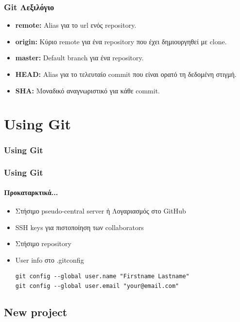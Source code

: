 \documentclass[handout]{beamer}
\begin{document}
\begin{frame}
  \frametitle{Git Λεξιλόγιο}
  \begin{itemize}
  \item \textbf{remote:} Alias για το url ενός repository.
  \item \textbf{origin:} Κύριο remote για ένα repository που έχει δημιουργηθεί
    με clone.
  \item \textbf{master:} Default branch για ένα repository.
  \item \textbf{HEAD:} Alias για το τελευταίο commit που είναι ορατό τη δεδομένη
    στιγμή. 
  \item \textbf{SHA:} Μοναδικό αναγνωριστικό για κάθε commit.
  \end{itemize}
\end{frame}

\section{Using Git}

\begin{frame}
  \frametitle{Using Git}
\end{frame}

\begin{frame}[fragile]
  \frametitle{Using Git}
  \framesubtitle{Προκαταρκτικά...}
  \begin{itemize}
    \item Στήσιμο pseudo-central server ή Λογαριασμός στο GitHub
    \item SSH keys για πιστοποίηση των collaborators
    \item Στήσιμο repository
    \item User info στο .gitconfig
\begin{verbatim}
git config --global user.name "Firstname Lastname"
git config --global user.email "your@email.com"
\end{verbatim}
  \end{itemize}
\end{frame}

\subsection{New project}
\end{document}
